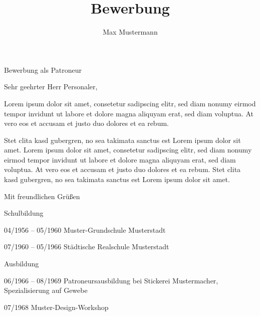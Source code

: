 \documentclass[german]{alpication}
\author{Max Mustermann}
\title{Bewerbung}
\begin{document}
% 
% 
\begin{correspondence}{Bewerbung als Patroneur}
	\opening{Sehr geehrter Herr Personaler,}

	Lorem ipsum dolor sit amet, consetetur sadipscing elitr, sed diam nonumy eirmod tempor invidunt ut labore
	et dolore magna aliquyam erat, sed diam voluptua. At vero eos et accusam et justo duo dolores et ea rebum.
	
	Stet clita kasd gubergren, no sea takimata sanctus est Lorem ipsum dolor sit amet. Lorem ipsum dolor sit amet,
	consetetur sadipscing elitr, sed diam nonumy eirmod tempor invidunt ut labore et dolore magna aliquyam erat,
	sed diam voluptua. At vero eos et accusam et justo duo dolores et ea rebum. Stet clita kasd gubergren, no sea
	takimata sanctus est Lorem ipsum dolor sit amet.

	\closing{Mit freundlichen Grüßen}
\end{correspondence}

% 
% 
\begin{curriculumvitae}
	\begin{cvsection}{Schulbildung}
		\item [04/1956 -- 05/1960] 	Muster-Grundschule Musterstadt
		\item [07/1960 -- 05/1966] 	Städtische Realschule Musterstadt
	\end{cvsection}

	\begin{cvsection}{Ausbildung}
		\item [06/1966 -- 08/1969] 	Patroneursausbildung bei Stickerei Mustermacher, Spezialisierung auf Gewebe
		\item [07/1968]			Muster-Design-Workshop
	\end{cvsection}
\end{curriculumvitae}

% 
% 
\end{document}
